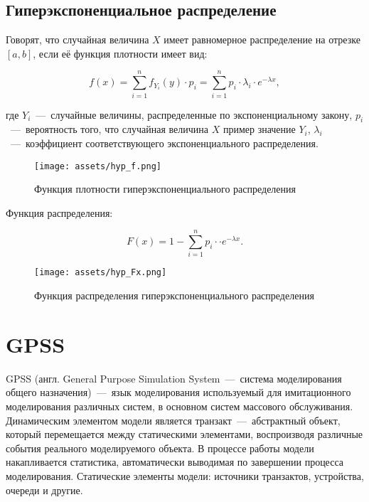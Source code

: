 \subsection{Гиперэкспоненциальное распределение}

Говорят, что случайная величина $X$ имеет равномерное распределение на отрезке $[a,b]$, если её функция плотности имеет вид:

\begin{equation}
    f (x) = \sum_{i=1}^{n} f_{Y_i}(y) \cdot p_i = \sum_{i=1}^{n} p_i \cdot \lambda_i \cdot e^{-\lambda x},
\end{equation}

\noindent где $Y_i$~---~случайные величины, распределенные по экспоненциальному закону, $p_i$~---~вероятность того, что случайная величина $X$ пример значение $Y_i$, $\lambda_i$~---~коэффициент соответствующего экспоненциального распределения.

\begin{figure}[H]
    \begin{center}
    \texttt{[image: assets/hyp\_f.png]}
    \caption{Функция плотности гиперэкспоненциального распределения}
    \label{fig:}
    \end{center}
\end{figure}

\newpage

Функция распределения:

\begin{equation}
F (x) = 1 - \sum_{i=1}^{n} p_i \cdot \cdot e^{-\lambda x}.
\end{equation}

\begin{figure}[H]
    \begin{center}
    \texttt{[image: assets/hyp\_Fx.png]}
    \caption{Функция распределения гиперэкспоненциального распределения}
    \label{fig:}
    \end{center}
\end{figure}

\section{GPSS}

GPSS (англ. General Purpose Simulation System~---~система моделирования общего назначения)~---~язык моделирования используемый для имитационного моделирования различных систем, в основном систем массового обслуживания. Динамическим элементом модели является транзакт~---~абстрактный объект, который перемещается между статическими элементами, воспроизводя различные события реального моделируемого объекта. В процессе работы модели накапливается статистика, автоматически выводимая по завершении процесса моделирования. Статические элементы модели: источники транзактов, устройства, очереди и другие.